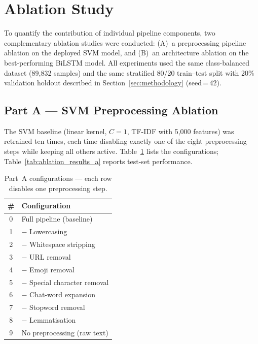 \FloatBarrier
\section{Ablation Study}
\label{sec:ablation}

To quantify the contribution of individual pipeline components, two complementary ablation studies were conducted: (A)~a preprocessing pipeline ablation on the deployed SVM model, and (B)~an architecture ablation on the best-performing BiLSTM model. All experiments used the same class-balanced dataset (89,832 samples) and the same stratified 80/20 train--test split with 20\% validation holdout described in Section~\ref{sec:methodology} (seed\,=\,42).

\subsection{Part A --- SVM Preprocessing Ablation}

The SVM baseline (linear kernel, $C = 1$, TF-IDF with 5,000 features) was retrained ten times, each time disabling exactly one of the eight preprocessing steps while keeping all others active. Table~\ref{tab:ablation_configs_a} lists the configurations; Table~\ref{tab:ablation_results_a} reports test-set performance.

\begin{table}[!htb]
\centering
\caption{Part~A configurations --- each row disables one preprocessing step.}
\label{tab:ablation_configs_a}
\footnotesize
\begin{tabular}{@{}cl@{}}
\toprule
\textbf{\#} & \textbf{Configuration} \\
\midrule
0 & Full pipeline (baseline) \\
1 & $-$ Lowercasing \\
2 & $-$ Whitespace stripping \\
3 & $-$ URL removal \\
4 & $-$ Emoji removal \\
5 & $-$ Special character removal \\
6 & $-$ Chat-word expansion \\
7 & $-$ Stopword removal \\
8 & $-$ Lemmatisation \\
9 & No preprocessing (raw text) \\
\bottomrule
\end{tabular}
\end{table}

